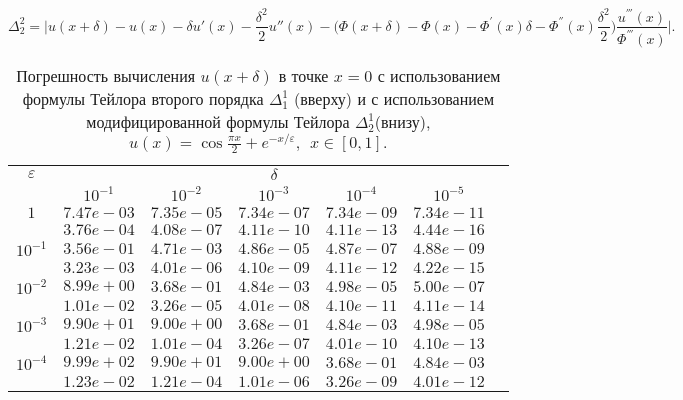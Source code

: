 \documentclass[10pt,twoside]{uz_kgu}
\begin{document}
	$$ \Delta_2^2 = \Big|u(x + \delta) - u(x)-\delta u'(x)  -\frac{\delta^2}{2}u''(x) - \Big(\Phi(x+\delta) - \Phi(x) -  \Phi^{'}(x)\delta - \Phi^{''}(x)\frac{\delta^2}{2}  \Big)\frac{u^{'''}(x)}{\Phi^{'''}(x)} \Big|.$$
	\newpage
	\begin{table} [!htb]
		\caption {Погрешность вычисления $u(x+ \delta)$ в точке $x=0$ с использованием формулы Тейлора второго порядка $\Delta_1^1$ (вверху) и с использованием модифицированной формулы Тейлора $\Delta_2^1$(внизу),
		$u(x)=  \cos \frac{\pi x}{2} + e^{-x/\varepsilon} ,\ \    x\in [0,1].$}
        \begin{center}
	\begin{tabular}{|c|c|c|c|c|c|c}
		\cline{1-6} $\varepsilon$ & \multicolumn{5}{c|}{$\delta$} \\
		\cline{2-6} &$10^{-1}$ & $10^{-2}$ & $10^{-3}$  & $10^{-4}$& $10^{-5}$\\
		\cline{1-6}
		$1$
		&$7.47e-03$&$7.35e-05$&$7.34e-07$&$7.34e-09$& $7.34e-11$\\
		&$3.76e-04$&$4.08e-07$&$4.11e-10$&$4.11e-13$& $4.44e-16$\\
		\cline{1-6}
		$10^{-1}$
		&$3.56e-01$&$4.71e-03$&$4.86e-05$&$4.87e-07$&$4.88e-09$\\
		&$3.23e-03$&$4.01e-06$&$4.10e-09$&$4.11e-12$&$4.22e-15$\\
		\cline{1-6}
		$10^{-2}$
		&$8.99e+00$&$3.68e-01$&$4.84e-03$&$4.98e-05$&$5.00e-07$\\
		&$1.01e-02$&$3.26e-05$&$4.01e-08$&$4.10e-11$&$4.11e-14$\\
		\cline{1-6}
		$10^{-3}$
		&$9.90e+01$&$9.00e+00$&$3.68e-01$&$4.84e-03$&$4.98e-05$\\
		&$1.21e-02$&$1.01e-04$&$3.26e-07$&$4.01e-10$&$4.10e-13$\\
		\cline{1-6}
		$10^{-4}$
		&$9.99e+02$&$9.90e+01$&$9.00e+00$&$3.68e-01$&$4.84e-03$\\
		&$1.23e-02$&$1.21e-04$&$1.01e-06$&$3.26e-09$&$4.01e-12$\\
		\cline{1-6}
	\end{tabular}
\end{center}
\end{table}
	
	
	
	
\end{document}
